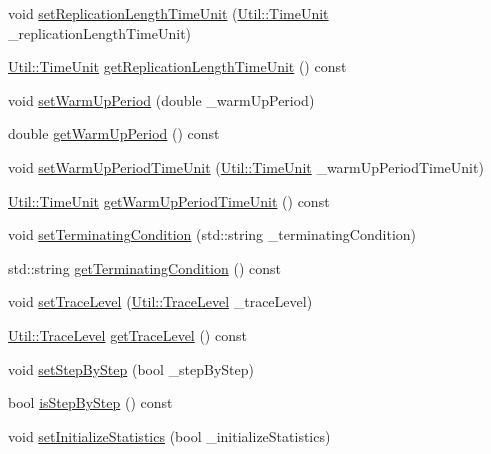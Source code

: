 \begin{DoxyCompactItemize}
\item 
void \hyperlink{class_model_a0261d2009ad7a3f9025e31cf02e6297a}{set\-Replication\-Length\-Time\-Unit} (\hyperlink{class_util_aadbd82055afeaa7d4fb4da513de628ff}{Util\-::\-Time\-Unit} \-\_\-replication\-Length\-Time\-Unit)
\item 
\hyperlink{class_util_aadbd82055afeaa7d4fb4da513de628ff}{Util\-::\-Time\-Unit} \hyperlink{class_model_aeaba7aa3fb5a75f469b7617910eee446}{get\-Replication\-Length\-Time\-Unit} () const 
\item 
void \hyperlink{class_model_ac6e4c4bd49b999b2f6ce5ad97d45bbae}{set\-Warm\-Up\-Period} (double \-\_\-warm\-Up\-Period)
\item 
double \hyperlink{class_model_aa7b278f97a29269a18dbcbb6513f39da}{get\-Warm\-Up\-Period} () const 
\item 
void \hyperlink{class_model_a864c1a3f96cd05b83894042e41ef5ea6}{set\-Warm\-Up\-Period\-Time\-Unit} (\hyperlink{class_util_aadbd82055afeaa7d4fb4da513de628ff}{Util\-::\-Time\-Unit} \-\_\-warm\-Up\-Period\-Time\-Unit)
\item 
\hyperlink{class_util_aadbd82055afeaa7d4fb4da513de628ff}{Util\-::\-Time\-Unit} \hyperlink{class_model_a12a97aefe53ac31b8e7801b50a87715a}{get\-Warm\-Up\-Period\-Time\-Unit} () const 
\item 
void \hyperlink{class_model_a480b4220ecfe82a1826ca29366a8d2b6}{set\-Terminating\-Condition} (std\-::string \-\_\-terminating\-Condition)
\item 
std\-::string \hyperlink{class_model_a3da1140b818632e728fd57445ab1880b}{get\-Terminating\-Condition} () const 
\item 
void \hyperlink{class_model_a538fdc09de27b077b4e4c84fdc78a61e}{set\-Trace\-Level} (\hyperlink{class_util_a604561d00f5999b5ca280401140e58d9}{Util\-::\-Trace\-Level} \-\_\-trace\-Level)
\item 
\hyperlink{class_util_a604561d00f5999b5ca280401140e58d9}{Util\-::\-Trace\-Level} \hyperlink{class_model_a0fa341be1579f13861af2eda84d4f840}{get\-Trace\-Level} () const 
\item 
void \hyperlink{class_model_a2b4b1bb4e9c082e8b0c893a35f5a8f53}{set\-Step\-By\-Step} (bool \-\_\-step\-By\-Step)
\item 
bool \hyperlink{class_model_a8bc24806234d057bedb4262ecc090bf0}{is\-Step\-By\-Step} () const 
\item 
void \hyperlink{class_model_a2fe72bb622b3d75479822f68710a36c7}{set\-Initialize\-Statistics} (bool \-\_\-initialize\-Statistics)
\item 

\end{DoxyCompactItemize}
